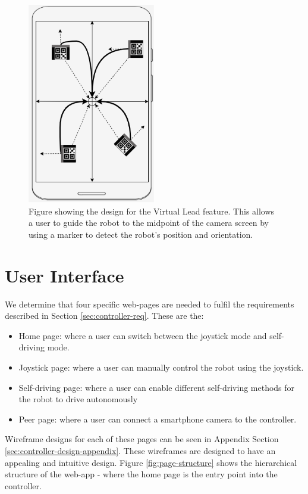 \documentclass{l4proj}
\begin{document}
\begin{figure}[!ht]
    \centering
    \includegraphics[width=0.50\textwidth]{images/virtual-lead-design.png}
    \caption{Figure showing the design for the Virtual Lead feature. This allows a user to guide the robot to the midpoint of the camera screen by using a marker to detect the robot's position and orientation.}
    \label{fig:virtual-lead-design}
\end{figure}


\section{User Interface}
We determine that four specific web-pages are needed to fulfil the requirements described in Section \ref{sec:controller-req}. These are the:
\begin{itemize}
    \item Home page: where a user can switch between the joystick mode and self-driving mode.
    \item Joystick page: where a user can manually control the robot using the joystick.
    \item Self-driving page: where a user can enable different self-driving methods for the robot to drive autonomously
    \item Peer page: where a user can connect a smartphone camera to the controller.
\end{itemize}

Wireframe designs for each of these pages can be seen in Appendix Section \ref{sec:controller-design-appendix}. These wireframes are designed to have an appealing and intuitive design. Figure \ref{fig:page-structure} shows the hierarchical structure of the web-app - where the home page is the entry point into the controller.
\end{document}

